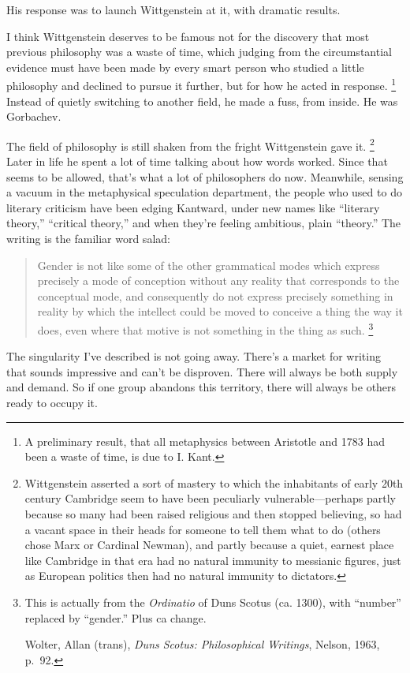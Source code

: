 His response was to launch Wittgenstein at it, with dramatic results.

I think Wittgenstein deserves to be famous not for the discovery that
most previous philosophy was a waste of time, which judging from the
circumstantial evidence must have been made by every smart person who
studied a little philosophy and declined to pursue it further, but for
how he acted in response. \footnote{A preliminary result, that all metaphysics between Aristotle
and 1783 had been a waste of time, is due to I. Kant.} Instead of quietly
switching to another field, he made a fuss, from inside. He was
Gorbachev.

The field of philosophy is still shaken from the fright Wittgenstein
gave it. \footnote{Wittgenstein asserted a sort of mastery to which the
inhabitants of early 20th century Cambridge seem to have been peculiarly
vulnerable---perhaps partly because so many had been raised religious
and then stopped believing, so had a vacant space in their heads for
someone to tell them what to do (others chose Marx or Cardinal Newman),
and partly because a quiet, earnest place like Cambridge in that era had
no natural immunity to messianic figures, just as European politics then
had no natural immunity to dictators.} Later in life he spent a lot of time
talking about how words worked. Since that seems to be allowed, that's
what a lot of philosophers do now. Meanwhile, sensing a vacuum in the
metaphysical speculation department, the people who used to do literary
criticism have been edging Kantward, under new names like ``literary
theory,'' ``critical theory,'' and when they're feeling ambitious, plain
``theory.'' The writing is the familiar word salad:

\begin{quote}
Gender is not like some of the other grammatical modes which express
precisely a mode of conception without any reality that corresponds to
the conceptual mode, and consequently do not express precisely something
in reality by which the intellect could be moved to conceive a thing the
way it does, even where that motive is not something in the thing as
such. \footnote{This is actually from the \emph{Ordinatio} of Duns Scotus (ca.
1300), with ``number'' replaced by ``gender.'' Plus ca change.

Wolter, Allan (trans), \emph{Duns Scotus: Philosophical Writings},
Nelson, 1963, p.~92.}
\end{quote}

The singularity I've described is not going away. There's a market for
writing that sounds impressive and can't be disproven. There will always
be both supply and demand. So if one group abandons this territory,
there will always be others ready to occupy it.

